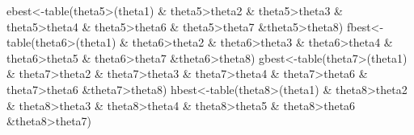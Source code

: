 \documentclass[
]{book}
\newenvironment{Shaded}{\begin{snugshade}}{\end{snugshade}}
\newcommand{\FunctionTok}[1]{\textcolor[rgb]{0.00,0.00,0.00}{#1}}
\newcommand{\NormalTok}[1]{#1}
\newcommand{\OtherTok}[1]{\textcolor[rgb]{0.56,0.35,0.01}{#1}}
\newcommand{\SpecialCharTok}[1]{\textcolor[rgb]{0.00,0.00,0.00}{#1}}
\theoremstyle{definition}
\theoremstyle{definition}
\theoremstyle{definition}
\theoremstyle{definition}
\theoremstyle{remark}
\begin{document}
\begin{Shaded}
\begin{Highlighting}[]
\NormalTok{  ebest}\OtherTok{\textless{}{-}}\FunctionTok{table}\NormalTok{(theta5}\SpecialCharTok{\textgreater{}}\NormalTok{(theta1) }\SpecialCharTok{\&}\NormalTok{ theta5}\SpecialCharTok{\textgreater{}}\NormalTok{theta2 }\SpecialCharTok{\&}\NormalTok{ theta5}\SpecialCharTok{\textgreater{}}\NormalTok{theta3 }\SpecialCharTok{\&}\NormalTok{ theta5}\SpecialCharTok{\textgreater{}}\NormalTok{theta4 }\SpecialCharTok{\&}\NormalTok{ theta5}\SpecialCharTok{\textgreater{}}\NormalTok{theta6 }\SpecialCharTok{\&}\NormalTok{ theta5}\SpecialCharTok{\textgreater{}}\NormalTok{theta7 }\SpecialCharTok{\&}\NormalTok{theta5}\SpecialCharTok{\textgreater{}}\NormalTok{theta8)}
\NormalTok{  fbest}\OtherTok{\textless{}{-}}\FunctionTok{table}\NormalTok{(theta6}\SpecialCharTok{\textgreater{}}\NormalTok{(theta1) }\SpecialCharTok{\&}\NormalTok{ theta6}\SpecialCharTok{\textgreater{}}\NormalTok{theta2 }\SpecialCharTok{\&}\NormalTok{ theta6}\SpecialCharTok{\textgreater{}}\NormalTok{theta3 }\SpecialCharTok{\&}\NormalTok{ theta6}\SpecialCharTok{\textgreater{}}\NormalTok{theta4 }\SpecialCharTok{\&}\NormalTok{ theta6}\SpecialCharTok{\textgreater{}}\NormalTok{theta5 }\SpecialCharTok{\&}\NormalTok{ theta6}\SpecialCharTok{\textgreater{}}\NormalTok{theta7 }\SpecialCharTok{\&}\NormalTok{theta6}\SpecialCharTok{\textgreater{}}\NormalTok{theta8)}
\NormalTok{  gbest}\OtherTok{\textless{}{-}}\FunctionTok{table}\NormalTok{(theta7}\SpecialCharTok{\textgreater{}}\NormalTok{(theta1) }\SpecialCharTok{\&}\NormalTok{ theta7}\SpecialCharTok{\textgreater{}}\NormalTok{theta2 }\SpecialCharTok{\&}\NormalTok{ theta7}\SpecialCharTok{\textgreater{}}\NormalTok{theta3 }\SpecialCharTok{\&}\NormalTok{ theta7}\SpecialCharTok{\textgreater{}}\NormalTok{theta4 }\SpecialCharTok{\&}\NormalTok{ theta7}\SpecialCharTok{\textgreater{}}\NormalTok{theta6 }\SpecialCharTok{\&}\NormalTok{ theta7}\SpecialCharTok{\textgreater{}}\NormalTok{theta6 }\SpecialCharTok{\&}\NormalTok{theta7}\SpecialCharTok{\textgreater{}}\NormalTok{theta8)}
\NormalTok{  hbest}\OtherTok{\textless{}{-}}\FunctionTok{table}\NormalTok{(theta8}\SpecialCharTok{\textgreater{}}\NormalTok{(theta1) }\SpecialCharTok{\&}\NormalTok{ theta8}\SpecialCharTok{\textgreater{}}\NormalTok{theta2 }\SpecialCharTok{\&}\NormalTok{ theta8}\SpecialCharTok{\textgreater{}}\NormalTok{theta3 }\SpecialCharTok{\&}\NormalTok{ theta8}\SpecialCharTok{\textgreater{}}\NormalTok{theta4 }\SpecialCharTok{\&}\NormalTok{ theta8}\SpecialCharTok{\textgreater{}}\NormalTok{theta5 }\SpecialCharTok{\&}\NormalTok{ theta8}\SpecialCharTok{\textgreater{}}\NormalTok{theta6 }\SpecialCharTok{\&}\NormalTok{theta8}\SpecialCharTok{\textgreater{}}\NormalTok{theta7)}
  

\end{Highlighting}
\end{Shaded}
\end{document}
